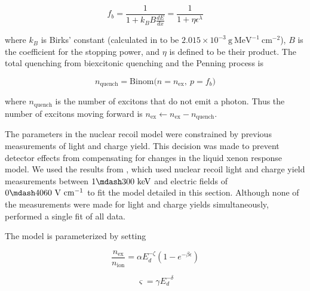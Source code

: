 \vspace{-15pt}

\begin{equation}
f_b = \frac{1}{1 + k_{B}B \frac{dE}{dx}} = \frac{1}{1 + \eta \epsilon^{\lambda}}
\label{eq:er_nr_calibrations_parameter_determ_nr_birks}
\end{equation}

\noindent where $k_B$ is Birks' constant (calculated in  to be $2.015 \times 10^{-3}\ \mathrm{g\ MeV^{-1}\ cm^{-2}}$),
$B$ is the coefficient for the stopping power, and $\eta$ is defined to be their product.  The total quenching from biexcitonic
quenching and the Penning process is

\vspace{-10pt}

\begin{equation}
n_{\mathrm{quench}} = \mathrm{Binom} \big( n = n_{\mathrm{ex}},\ p = f_b \big)
\end{equation}

\noindent where $n_{\mathrm{quench}}$ is the number of excitons that do not emit a photon.  Thus the number of excitons moving forward
is $n_{\mathrm{ex}} \leftarrow n_{\mathrm{ex}} - n_{\mathrm{quench}}$.

The parameters in the nuclear recoil model were constrained by previous measurements of light and charge
yield.  This decision was made to prevent detector effects from compensating for changes
in the liquid xenon response model.  We used the results from , which used nuclear recoil light and charge yield
measurements between $1 \mdash 300\ \mathrm{keV}$ and electric fields of $0 \mdash 4060\ \mathrm{V\ cm^{-1}}$ to fit the model
detailed in this section.  Although none of the measurements were made for light and charge yields simultaneously, 
performed a single fit of all data.

The model is parameterized by setting

\vspace{-5pt}

\begin{equation}
\frac{n_{\mathrm{ex}}}{n_{\mathrm{ion}}} = \alpha E_{d}^{-\zeta} ( 1 - e^{-\beta \epsilon})
\label{eq:er_nr_calibrations_parameter_determ_nr_nex_nion}
\end{equation}

\vspace{-15pt}

\begin{equation}
\varsigma = \gamma E_{d}^{- \delta}
\label{eq:er_nr_calibrations_parameter_determ_nr_recomb_sigma}
\end{equation}

